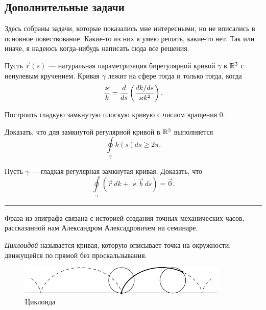 \subsection{Дополнительные задачи}

Здесь собраны задачи, которые показались мне интересными, но не вписались в основное повествование. Какие-то из них я умею решать, какие-то нет. Так или иначе, я надеюсь когда-нибудь написать сюда все решения.

\begin{problem}
	Пусть $\vec{r}(s)$ --- натуральная параметризация бирегулярной кривой $\gamma$ в $\mathbb{R}^3$ с ненулевым кручением. Кривая $\gamma$ лежит на сфере тогда и только тогда, когда
	\[
		\frac{\varkappa}{k} = \frac{d}{ds}\left(\frac{dk / ds}{\varkappa k^2}\right).
	\]
\end{problem}

\begin{problem}
	Построить гладкую замкнутую плоскую кривую с числом вращения $0$.
\end{problem}

\begin{problem}
	Доказать, что для замкнутой регулярной кривой в $\mathbb{R}^3$ выполняется
	\[
		\oint\limits_{\gamma}k(s)ds \geqslant 2\pi.
	\]
\end{problem}

\begin{problem}
	Пусть $\gamma$ --- гладкая регулярная замкнутая кривая. Доказать, что
	\[
		\oint\limits_{\gamma}(\vec{r}\,dk + \varkappa\vec{b}\,ds) = \vec{0}.
	\]
\end{problem}

\medskip
\hrule
\medskip

Фраза из эпиграфа связана с историей создания точных механических часов, рассказанной нам Александром Алексадровичем на семинаре.

\textit{Циклоидой} называется кривая, которую описывает точка на окружности, движущейся по прямой без проскальзывания.

\begin{figure}[H]
	\centering
	\includegraphics[width=10cm]{./img/Cycloid.pdf}
	\caption{Циклоида}
\end{figure}



